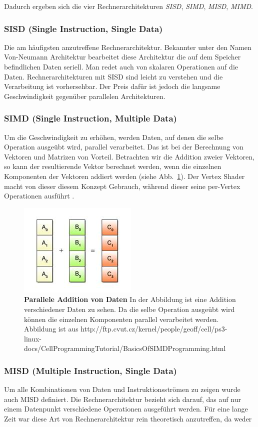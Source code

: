 Dadurch ergeben sich die vier Rechnerarchitekturen \textit{SISD}, \textit{SIMD}, \textit{MISD}, \textit{MIMD}.
\subsubsection*{SISD (Single Instruction, Single Data)}
Die am häufigsten anzutreffene Rechnerarchitektur.
Bekannter unter den Namen Von-Neumann Architektur bearbeitet diese Architektur die auf dem Speicher befindlichen Daten seriell.
Man redet auch von skalaren Operationen auf die Daten.
Rechnerarchitekturen mit SISD sind leicht zu verstehen und die Verarbeitung ist vorhersehbar.
Der Preis dafür ist jedoch die langsame Geschwindigkeit gegenüber parallelen Architekturen.
\subsubsection*{SIMD (Single Instruction, Multiple Data)}
Um die Geschwindigkeit zu erhöhen, werden Daten, auf denen die selbe Operation ausgeübt wird, parallel verarbeitet.
Das ist bei der Berechnung von Vektoren und Matrizen von Vorteil.
Betrachten wir die Addition zweier Vektoren, so kann der resultierende Vektor berechnet werden, wenn die einzelnen Komponenten der Vektoren addiert werden (siehe Abb.~\ref{fig:simd_pattern}). Der Vertex Shader macht von dieser diesem Konzept Gebrauch, während dieser seine per-Vertex Operationen ausführt \cite{DalCin1996}.
\begin{figure}[htb]
  \centering  
  \includegraphics[scale=1.0]{Bilder/Simd_pattern.jpg}
  \caption[SIMD Pattern]{\textbf{Parallele Addition von Daten} In der Abbildung ist eine Addition verschiedener Daten zu sehen. Da die selbe Operation ausgeübt wird können die einzelnen Komponenten parallel verarbeitet werden.
  Abbildung ist aus http://ftp.cvut.cz/kernel/people/geoff/cell/ps3-linux-docs/CellProgrammingTutorial/BasicsOfSIMDProgramming.html }
  \label{fig:simd_pattern}
\end{figure} 
\subsubsection*{MISD (Multiple Instruction, Single Data)}
Um alle Kombinationen von Daten und Instruktionsströmen zu zeigen wurde auch MISD definiert.
Die Rechnerarchitektur bezieht sich darauf, das auf nur einem Datenpunkt verschiedene Operationen ausgeführt werden.
Für eine lange Zeit war diese Art von Rechnerarchitektur rein theoretisch anzutreffen, da weder 
